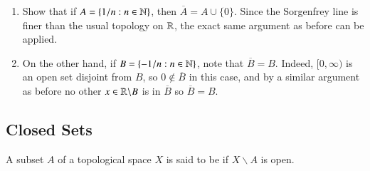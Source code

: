 \documentclass[12pt, a4paper, oneside, openright, titlepage]{book}
\begin{document}
\begin{example}
\begin{enumerate}
\begin{enumerate}
                \item Show that if $A = \{1/n:n \in \mathbb N\}$, then $\overline{A} = A\cup\{0\}$. Since the Sorgenfrey line is finer than the usual topology on $\mathbb R$, the exact same argument as before can be applied.
                \item On the other hand, if $B = \{-1/n:n \in \mathbb N\}$, note that $\overline{B} = B$. Indeed, $[0,\infty)$ is an open set disjoint from $B$, so $0 \notin \overline{B}$ in this case, and by a similar argument as before no other $x \in \mathbb R\backslash B$ is in $\overline{B}$ so $\overline{B} = B$.
        \end{enumerate}
    \end{enumerate}
\end{example}



\subsection{Closed Sets}

\begin{definition}
    A subset $A$ of a topological space $X$ is said to be  if $X\backslash A$ is open.
\end{definition}
\end{document}
